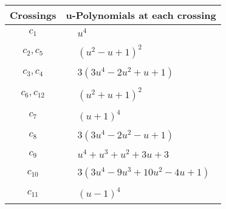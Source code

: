 \documentclass[1p]{elsarticle_modified}
\theoremstyle{definition}
\begin{document}
\begin{tabular}{m{50pt}|m{274pt}}
Crossings & \hspace{64pt}u-Polynomials at each crossing \\
\hline $$\begin{aligned}c_{1}\end{aligned}$$&$\begin{aligned}
&u^4
\end{aligned}$\\
\hline $$\begin{aligned}c_{2},c_{5}\end{aligned}$$&$\begin{aligned}
&(u^2- u+1)^2
\end{aligned}$\\
\hline $$\begin{aligned}c_{3},c_{4}\end{aligned}$$&$\begin{aligned}
&3(3 u^4-2 u^2+u+1)
\end{aligned}$\\
\hline $$\begin{aligned}c_{6},c_{12}\end{aligned}$$&$\begin{aligned}
&(u^2+u+1)^2
\end{aligned}$\\
\hline $$\begin{aligned}c_{7}\end{aligned}$$&$\begin{aligned}
&(u+1)^4
\end{aligned}$\\
\hline $$\begin{aligned}c_{8}\end{aligned}$$&$\begin{aligned}
&3(3 u^4-2 u^2- u+1)
\end{aligned}$\\
\hline $$\begin{aligned}c_{9}\end{aligned}$$&$\begin{aligned}
&u^4+u^3+u^2+3 u+3
\end{aligned}$\\
\hline $$\begin{aligned}c_{10}\end{aligned}$$&$\begin{aligned}
&3(3 u^4-9 u^3+10 u^2-4 u+1)
\end{aligned}$\\
\hline $$\begin{aligned}c_{11}\end{aligned}$$&$\begin{aligned}
&(u-1)^4
\end{aligned}$\\
\hline
\end{tabular}\\~\\
\end{document}
